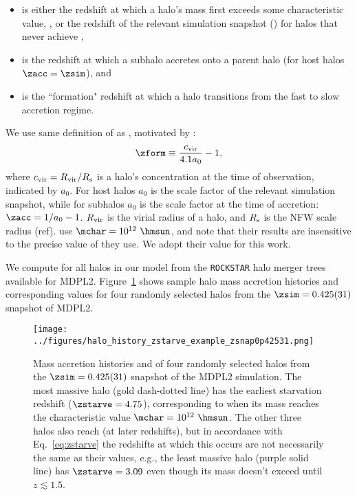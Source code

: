 \documentclass[twocolumn,apj,iop,tighten]{emulateapj2}
\begin{document}
\begin{itemize}
\item \zchar is either the redshift at which a halo's mass first exceeds some characteristic value, \mchar, or the redshift of the relevant simulation snapshot (\zsim) for halos that never achieve \mchar,
%
\item \zacc is the redshift at which a subhalo accretes onto a parent halo (for host halos ${\zacc=\zsim}$), and
%
\item \zform is the ``formation" redshift at which a halo transitions from the fast to slow accretion regime.
\end{itemize}
\noindent We use same definition of \zform as \citet{hearin_watson13}, motivated by \citet{wechsler_etal02}:
%
\begin{equation}\label{eq:zform}
\zform \equiv \frac{c_{\rm vir}}{4.1 a_0} - 1,
\end{equation}
%
\noindent where ${c_{\rm vir} = R_{\rm vir}/R_{\rm s}}$ is a halo's concentration at the time of observation, indicated by $a_0$. For host halos $a_0$ is the scale factor of the relevant simulation snapshot, while for subhalos $a_0$ is the scale factor at the time of accretion: ${\zacc = 1/{a_0} - 1}$. $R_{\rm vir}$ is the virial radius of a halo, and $R_{\rm s}$ is the NFW scale radius (ref). \citet{hearin_watson13} use ${\mchar=10^{12}\ \hmsun}$, and note that their results are insensitive to the precise value of \mchar they use. We adopt their value for this work.

We compute \zstarve for all halos in our model from the \texttt{ROCKSTAR} halo merger trees available for MDPL2. Figure~\ref{fig:zstarve_example} shows sample halo mass accretion histories and corresponding \zstarve values for four randomly selected halos from the $\zsim=0.425(31)$ snapshot of MDPL2.

\begin{figure}
\centering
\texttt{[image: ../figures/halo\_history\_zstarve\_example\_zsnap0p42531.png]}
\caption{Mass accretion histories and \zstarve of four randomly selected halos from the $\zsim=0.425(31)$ snapshot of the MDPL2 simulation. The most massive halo (gold dash-dotted line) has the earliest starvation redshift ($\zstarve=4.75$), corresponding to when its mass reaches the characteristic value ${\mchar=10^{12}\ \hmsun}$. The other three halos also reach \mchar (at later redshifts), but in accordance with Eq.~\ref{eq:zstarve} the redshifts at which this occurs are not necessarily the same as their \zstarve values, e.g., the least massive halo (purple solid line) has $\zstarve=3.09$ even though its mass doesn't exceed \mchar until $z\lesssim1.5$.
}
\label{fig:zstarve_example}
\end{figure}
\end{document}
